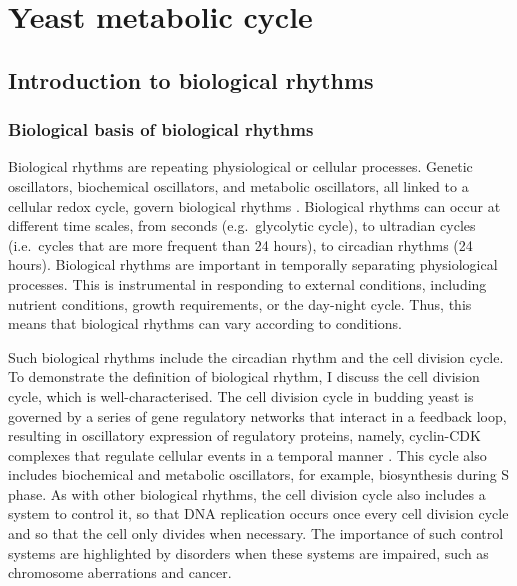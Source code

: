 \section{Yeast metabolic cycle}
\label{sec:intro-ymc}

\subsection{Introduction to biological rhythms}
\label{subsec:intro-ymc-biological_rhythms}

\subsubsection{Biological basis of biological rhythms}
\label{subsubsec:intro-ymc-biological_rhythms-biological_basis}


Biological rhythms are repeating physiological or cellular processes.
Genetic oscillators, biochemical oscillators, and metabolic oscillators, all linked to a cellular redox cycle, govern biological rhythms \parencite{mellorMolecularBasisMetabolic2016}.
Biological rhythms can occur at different time scales, from seconds (e.g.\ glycolytic cycle), to ultradian cycles (i.e.\ cycles that are more frequent than 24 hours), to circadian rhythms (24 hours).
Biological rhythms are important in temporally separating physiological processes.
This is instrumental in responding to external conditions, including nutrient conditions, growth requirements, or the day-night cycle.
Thus, this means that biological rhythms can vary according to conditions.

Such biological rhythms include the circadian rhythm and the cell division cycle.
To demonstrate the definition of biological rhythm, I discuss the cell division cycle, which is well-char\-ac\-terised.
The cell division cycle in budding yeast is governed by a series of gene regulatory networks that interact in a feedback loop, resulting in oscillatory expression of regulatory proteins, namely, cyclin-CDK complexes that regulate cellular events in a temporal manner \parencite{adlerYeastCellCycle2022, orlandoGlobalControlCellcycle2008, murrayRecyclingCellCycle2004}.
This cycle also includes biochemical and metabolic oscillators, for example, biosynthesis during S phase.
As with other biological rhythms, the cell division cycle also includes a system to control it, so that DNA replication occurs once every cell division cycle and so that the cell only divides when necessary.
The importance of such control systems are highlighted by disorders when these systems are impaired, such as chromosome aberrations and cancer.

